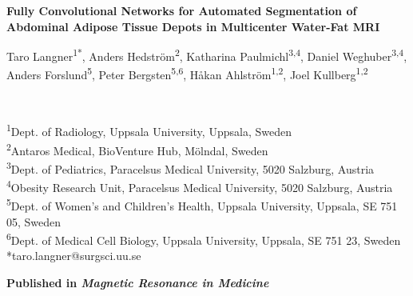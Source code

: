 \documentclass[10pt,letterpaper]{article}
\begin{document}
	
	\begin{center}
		\textbf{\Large
			Fully Convolutional Networks for Automated Segmentation of Abdominal Adipose Tissue Depots in Multicenter Water-Fat MRI}\\
		\vspace{0.5cm}
		\begin{large}
			Taro Langner\textsuperscript{1*},
			Anders Hedström\textsuperscript{2},			
			Katharina Paulmichl\textsuperscript{3,4},
			Daniel Weghuber\textsuperscript{3,4},\\
			Anders Forslund\textsuperscript{5},
			Peter Bergsten\textsuperscript{5,6},
			Håkan Ahlström\textsuperscript{1,2},
			Joel Kullberg\textsuperscript{1,2}
		\end{large}
		\\
		\bigskip
	\end{center}
	
	
	\textsuperscript{1}Dept. of Radiology, Uppsala University, Uppsala, Sweden
	\\
	\textsuperscript{2}Antaros Medical, BioVenture Hub, Mölndal, Sweden
	\\
	\textsuperscript{3}Dept. of Pediatrics, Paracelsus Medical University, 5020 Salzburg, Austria
	\\
	\textsuperscript{4}Obesity Research Unit, Paracelsus Medical University, 5020 Salzburg, Austria
	\\
	\textsuperscript{5}Dept. of Women’s and Children’s Health, Uppsala University, Uppsala, SE 751 05, Sweden
	\\
	\textsuperscript{6}Dept. of Medical Cell Biology, Uppsala University, Uppsala, SE 751 23, Sweden
	\\
	
	
	\bigskip
	*taro.langner@surgsci.uu.se
	
	
	\bigskip
	\textbf{Published in \textit{Magnetic Resonance in Medicine}}
	\bigskip
\end{document}
